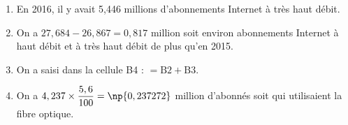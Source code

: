 
\medskip

%
%

%
%
\begin{enumerate}
	\item %
	En 2016, il y avait 5,446 millions d'abonnements Internet à très haut débit.
	\item %
	On a $27,684 - 26,867 = 0,817$ million soit environ  abonnements Internet à haut débit et à très haut débit de plus qu'en 2015.
	\item %
On a saisi dans la cellule \textsf{B4} : $=\text{B}2 + \text{B}3$.
	\item %
	
On a $4,237 \times \dfrac{5,6}{100} = \np{0,237272}$ million d'abonnés soit  qui utilisaient la fibre optique.
\end{enumerate}

\vspace{0,5cm}

